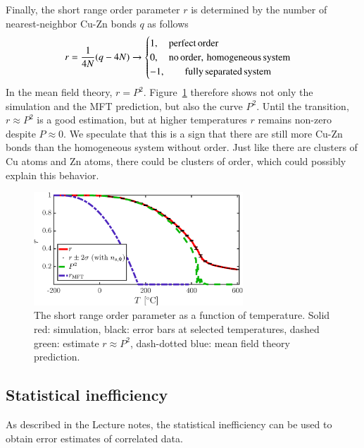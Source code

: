 Finally, the short range order parameter $r$ is determined by the number of nearest-neighbor Cu-Zn bonds $q$ as follows
\begin{equation}
r = \frac{1}{4 N}(q-4N) \rightarrow \begin{cases}
1, \quad {\rm perfect \, order} \\
0, \quad  {\rm no \, order, \, homogeneous \, system}\\
-1, \qquad {\rm fully \, separated \, system}
\end{cases}
\end{equation}
In the mean field theory, $r = P^2$. Figure~\ref{fig:r} therefore shows not only the simulation and the MFT prediction, but also the curve $P^2$. Until the transition, $r \approx P^2$ is a good estimation, but at higher temperatures $r$ remains non-zero despite $P \approx 0$. We speculate that this is a sign that there are still more Cu-Zn bonds than the homogeneous system without order. Just like there are clusters of Cu atoms and Zn atoms, there could be clusters of order, which could possibly explain this behavior. 

\begin{figure}[!ht]
\begin{center}
  \includegraphics[width=0.7\textwidth]{../figures/r} 
  \caption{The short range order parameter as a function of temperature. Solid red: simulation, black: error bars at selected temperatures, dashed green: estimate $r \approx P^2$, dash-dotted blue: mean field theory prediction. }
  \label{fig:r}
\end{center}
\end{figure}




\subsection*{Statistical inefficiency}
\label{sec:ns}
As described in the Lecture notes, the statistical inefficiency can be used to obtain error estimates of correlated data. 

